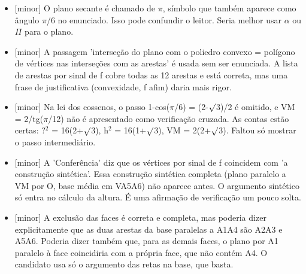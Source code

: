 \documentclass{article}%
\begin{document}
\begin{itemize}%
\item%
{[}minor{]} O plano secante é chamado de $\pi$, símbolo que também aparece como ângulo $\pi$/6 no enunciado. Isso pode confundir o leitor. Seria melhor usar $\alpha$ ou $\Pi$ para o plano.%
\item%
{[}minor{]} A passagem 'interseção do plano com o poliedro convexo = polígono de vértices nas interseções com as arestas' é usada sem ser enunciada. A lista de arestas por sinal de f cobre todas as 12 arestas e está correta, mas uma frase de justificativa (convexidade, f afim) daria mais rigor.%
\item%
{[}minor{]} Na lei dos cossenos, o passo 1-cos($\pi$/6) = (2-$\surd$3)/2 é omitido, e VM = 2/tg($\pi$/12) não é apresentado como verificação cruzada. As contas estão certas: ?$^2$ = 16(2+$\surd$3), h$^2$ = 16(1+$\surd$3), VM = 2(2+$\surd$3). Faltou só mostrar o passo intermediário.%
\item%
{[}minor{]} A 'Conferência' diz que os vértices por sinal de f coincidem com 'a construção sintética'. Essa construção sintética completa (plano paralelo a VM por O, base média em VA5A6) não aparece antes. O argumento sintético só entra no cálculo da altura. É uma afirmação de verificação um pouco solta.%
\item%
{[}minor{]} A exclusão das faces é correta e completa, mas poderia dizer explicitamente que as duas arestas da base paralelas a A1A4 são A2A3 e A5A6. Poderia dizer também que, para as demais faces, o plano por A1 paralelo à face coincidiria com a própria face, que não contém A4. O candidato usa só o argumento das retas na base, que basta.%
\end{itemize}%
\end{document}
